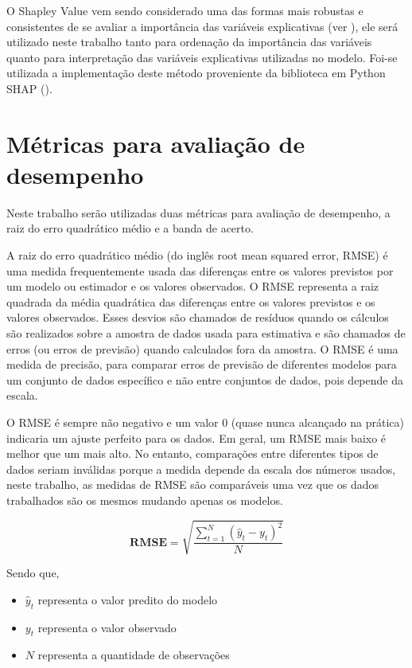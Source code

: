 O Shapley Value vem sendo considerado uma das formas mais robustas e consistentes de se avaliar a importância das variáveis explicativas (ver \citet{Lundberg2017}), ele será utilizado neste trabalho tanto para ordenação da importância das variáveis quanto para interpretação das variáveis explicativas utilizadas no modelo. Foi-se utilizada a implementação deste método proveniente da biblioteca em Python SHAP (\citet{Shap}).

\section{Métricas para avaliação de desempenho}
\label{sec:metricas_avaliacao}

Neste trabalho serão utilizadas duas métricas para avaliação de desempenho, a raiz do erro quadrático médio e a banda de acerto.

A raiz do erro quadrático médio (do inglês root mean squared error, RMSE) é uma medida frequentemente usada das diferenças entre os valores previstos por um modelo ou estimador e os valores observados. O RMSE representa a raiz quadrada da média quadrática das diferenças entre os valores previstos e os valores observados. Esses desvios são chamados de resíduos quando os cálculos são realizados sobre a amostra de dados usada para estimativa e são chamados de erros (ou erros de previsão) quando calculados fora da amostra. O RMSE é uma medida de precisão, para comparar erros de previsão de diferentes modelos para um conjunto de dados específico e não entre conjuntos de dados, pois depende da escala.

O RMSE é sempre não negativo e um valor 0 (quase nunca alcançado na prática) indicaria um ajuste perfeito para os dados. Em geral, um RMSE mais baixo é melhor que um mais alto. No entanto, comparações entre diferentes tipos de dados seriam inválidas porque a medida depende da escala dos números usados, neste trabalho, as medidas de RMSE são comparáveis uma vez que os dados trabalhados são os mesmos mudando apenas os modelos.

\begin{equation}
\mathbf {RMSE} ={\sqrt {\frac {\sum _{t=1}^{N}({\hat {y}}_{t}-y_{t})^{2}}{N}}}
\end{equation}

Sendo que,

\begin{itemize}
    \item $ \hat y_t $ representa o valor predito do modelo
    \item $ y_t $ representa o valor observado
    \item $ N $ representa a quantidade de observações
\end{itemize}

